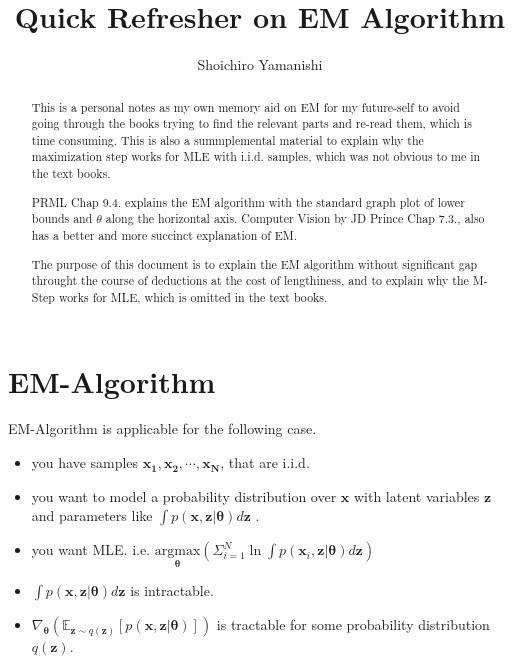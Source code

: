 \documentclass[a4]{article}
\title{Quick Refresher on EM Algorithm}
\author{Shoichiro Yamanishi}
\begin{document}
\maketitle

\begin{abstract}
This is a personal notes as my own memory aid on EM for my future-self to avoid 
going through the books trying to find the relevant parts and re-read them, which
is time consuming.
This is also a summplemental material to explain why the maximization step
works for MLE with i.i.d. samples, which was not obvious to me in the text books.

PRML\cite{bishop2007} Chap 9.4. explains the EM algorithm 
with the standard graph plot of lower bounds and $\theta$ along the horizontal axis.
Computer Vision by JD Prince\cite{prince_2012} Chap 7.3.,
also has a better and more succinct explanation of EM.

The purpose of this document is to explain the EM algorithm without significant gap
throught the course of deductions at the cost of lengthiness, and to explain why
the M-Step works for MLE, which is omitted in the text books.

\end{abstract}

\section{EM-Algorithm}

EM-Algorithm is applicable for the following case.

\begin{itemize}

\item you have samples $\mathbf{x_1}, \mathbf{x_2}, \cdots, \mathbf{x_N}$, that are i.i.d.

\item you want to model a probability distribution over $\mathbf{x}$ with latent variables
$\mathbf{z}$ and parameters like $\int p(\mathbf{x},\mathbf{z}|\bm{\theta})d\mathbf{z}$ .

\item you want MLE. i.e.
$\underset{\bm{\theta}}{\mathrm{argmax}} \left(
     \Sigma_{i = 1}^N \ln \int p(\mathbf{x}_i,\mathbf{z} | \bm{\theta})d\mathbf{z}
\right)$

\item $\int p(\mathbf{x},\mathbf{z}|\bm{\theta})d\mathbf{z}$ is intractable.

\item 
$\nabla_{\bm{\theta}} \left(
     \mathbb{E}_{\mathbf{z}\sim q(\mathbf{z})}[p(\mathbf{x},\mathbf{z}|\bm{\theta})]
\right)$
is tractable for some probability distribution $q(\mathbf{z})$.

\end{itemize}
\end{document}
